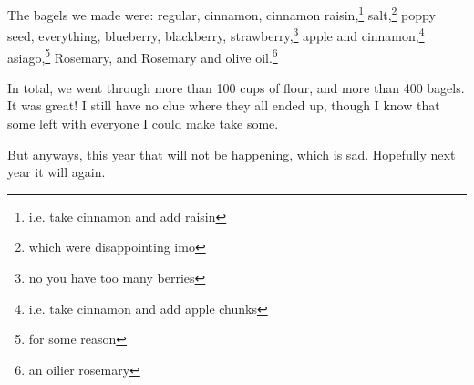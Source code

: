 \documentclass[12pt]{article}[titlepage]
\newcommand{\1}{\={a}}
\newcommand{\2}{\={e}}
\newcommand{\3}{\={\i}}
\newcommand{\4}{\=o}
\newcommand{\5}{\=u}
\newcommand{\6}{\={A}}
\renewcommand{\,}{\textsuperscript{,}}
\begin{document}
The bagels we made were:
	regular,
	cinnamon,
	cinnamon raisin,\footnote{i.e. take cinnamon and add raisin}
	salt,\footnote{which were disappointing imo}
	poppy seed,
	everything,
	blueberry,
	blackberry,
	strawberry,\footnote{no you have too many berries}
	apple and cinnamon,\footnote{i.e. take cinnamon and add apple chunks}
	asiago,\footnote{for some reason}
	Rosemary, and
	Rosemary and olive oil.\footnote{an oilier rosemary}

In total, we went through more than 100 cups of flour, and more than 400 bagels.
It was great!
I still have no clue where they all ended up, though I know that some left with everyone I could make take some.

But anyways, this year that will not be happening, which is sad.
Hopefully next year it will again. 
\end{document}
